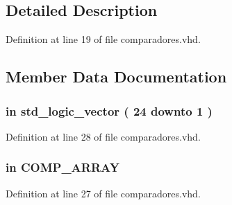 \subsection{Detailed Description}


Definition at line 19 of file comparadores.\+vhd.



\subsection{Member Data Documentation}
\hypertarget{classcomparadores_a0d7d8d086cf18e0180f8c280d76ed624}{}
\subsubsection[{amost}]{ {\bfseries \textcolor{keywordflow}{in}\textcolor{vhdlchar}{ }} {\bfseries \textcolor{comment}{std\+\_\+logic\+\_\+vector}\textcolor{vhdlchar}{ }\textcolor{vhdlchar}{(}\textcolor{vhdlchar}{ }\textcolor{vhdlchar}{ } \textcolor{vhdldigit}{24} \textcolor{vhdlchar}{ }\textcolor{keywordflow}{downto}\textcolor{vhdlchar}{ }\textcolor{vhdlchar}{ } \textcolor{vhdldigit}{1} \textcolor{vhdlchar}{ }\textcolor{vhdlchar}{)}\textcolor{vhdlchar}{ }} \hspace{0.3cm}{\ttfamily [Port]}}\label{classcomparadores_a0d7d8d086cf18e0180f8c280d76ed624}


Definition at line 28 of file comparadores.\+vhd.

\hypertarget{classcomparadores_ab52608f377848fc687beeb76bb39a6e8}{}
\subsubsection[{c}]{ {\bfseries \textcolor{keywordflow}{in}\textcolor{vhdlchar}{ }} {\bfseries {\bfseries {\bf C\+O\+M\+P\+\_\+\+A\+R\+R\+A\+Y}} \textcolor{vhdlchar}{ }} \hspace{0.3cm}{\ttfamily [Port]}}\label{classcomparadores_ab52608f377848fc687beeb76bb39a6e8}


Definition at line 27 of file comparadores.\+vhd.

\hypertarget{classcomparadores_a4a4609c199d30b3adebbeb3a01276ec5}{}
